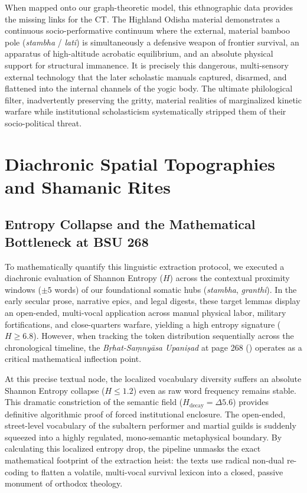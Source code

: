 \documentclass[11pt,twoside,letterpaper]{article}
\begin{document}
When mapped onto our graph-theoretic model, this ethnographic data provides the missing links for the CT. The Highland Odisha material demonstrates a continuous socio-performative continuum where the external, material bamboo pole (\textit{stambha} / \textit{lati}) is simultaneously a defensive weapon of frontier survival, an apparatus of high-altitude acrobatic equilibrium, and an absolute physical support for structural immanence. It is precisely this dangerous, multi-sensory external technology that the later scholastic manuals captured, disarmed, and flattened into the internal channels of the yogic body. The ultimate philological filter, inadvertently preserving the gritty, material realities of marginalized kinetic warfare while institutional scholasticism systematically stripped them of their socio-political threat.




\section{Diachronic Spatial Topographies and Shamanic Rites}

\subsection{Entropy Collapse and the Mathematical Bottleneck at BSU 268}
To mathematically quantify this linguistic extraction protocol, we executed a diachronic evaluation of Shannon Entropy ($H$) across the contextual proximity windows ($\pm 5$ words) of our foundational somatic hubs (\textit{stambha}, \textit{granthi}). In the early secular prose, narrative epics, and legal digests, these target lemmas display an open-ended, multi-vocal application across manual physical labor, military fortifications, and close-quarters warfare, yielding a high entropy signature ($H \ge 6.8$). However, when tracking the token distribution sequentially across the chronological timeline, the \textit{Bṛhat-Saṃnyāsa Upaniṣad} at page 268 (\cite{olivelle1992}) operates as a critical mathematical inflection point.

At this precise textual node, the localized vocabulary diversity suffers an absolute Shannon Entropy collapse ($H \le 1.2$) even as raw word frequency remains stable. This dramatic constriction of the semantic field ($H_{\text{decay}} = \Delta 5.6$) provides definitive algorithmic proof of forced institutional enclosure. The open-ended, street-level vocabulary of the subaltern performer and martial guilds is suddenly squeezed into a highly regulated, mono-semantic metaphysical boundary. By calculating this localized entropy drop, the pipeline unmasks the exact mathematical footprint of the extraction heist: the texts use radical non-dual re-coding to flatten a volatile, multi-vocal survival lexicon into a closed, passive monument of orthodox theology.
\label{sec:diachronic_spatial_topographies}
\end{document}
